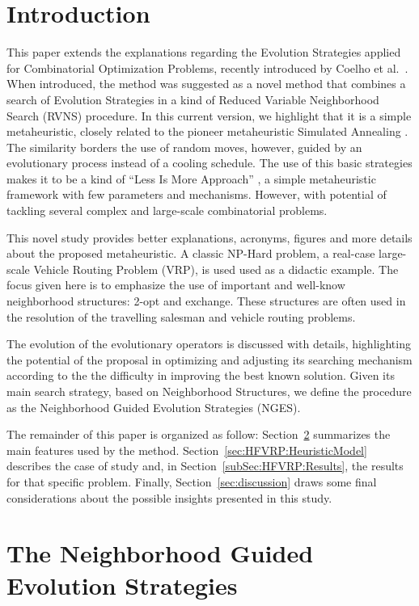 \documentclass{endm}
\begin{document}
\section{Introduction}
This paper extends the explanations regarding the Evolution Strategies applied for Combinatorial Optimization Problems, recently introduced by Coelho et al.~\cite{Coelho2016MIT}.
When introduced, the method was suggested as a novel method  that combines a search of Evolution Strategies \cite{Beyer02} in a kind of Reduced Variable Neighborhood Search (RVNS) \cite{Hansen-2008b} procedure.
In this current version, we highlight that it is a simple metaheuristic, closely related to the pioneer metaheuristic Simulated Annealing \cite{kirkpatrick1983SA}.
The similarity borders the use of random moves, however, guided by an evolutionary process instead of a cooling schedule.
The use of this basic strategies makes it to be a kind of ``Less Is More Approach'' \cite{COSTA2017247}, a simple metaheuristic framework with few parameters and mechanisms.
However, with potential of tackling several complex and large-scale combinatorial problems.

This novel study provides better explanations, acronyms, figures and more details about the proposed metaheuristic.
A classic NP-Hard problem, a real-case large-scale Vehicle Routing Problem (VRP), is used used as a didactic example. 
The focus given here is to emphasize the use of important and well-know neighborhood structures: 2-opt and exchange.
These structures are often used in the resolution of the travelling salesman and vehicle routing problems.

The evolution of the evolutionary operators is discussed with details, highlighting the potential of the proposal in optimizing and adjusting its searching mechanism according to the the difficulty in improving the best known solution.
Given its main search strategy, based on Neighborhood Structures, we define the procedure as the Neighborhood Guided Evolution Strategies (NGES).

The remainder of this paper is organized as follow:
Section~\ref{sec:NGES} summarizes the main features used by the method.
Section~\ref{sec:HFVRP:HeuristicModel} describes the case of study and, in Section~\ref{subSec:HFVRP:Results}, the results for that specific problem. 
Finally, Section~\ref{sec:discussion} draws some final considerations about the possible insights presented in this study.


\section{The Neighborhood Guided Evolution Strategies} \label{sec:NGES}
\end{document}
